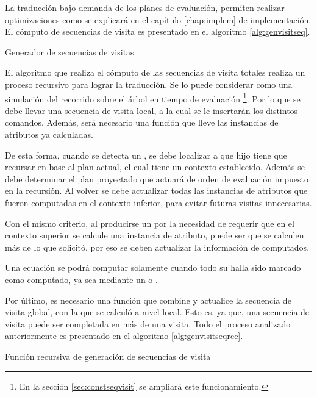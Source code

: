La traducción bajo demanda de los planes de evaluación, permiten realizar optimizaciones como se explicará en el capítulo \ref{chap:implem} de implementación. El cómputo de secuencias de visita es presentado en el algoritmo \ref{alg:genvisitseq}.

\begin{algorithm}[!ht]

\caption{\label{alg:genvisitseq} Generador de secuencias de visitas}
\end{algorithm}

El algoritmo que realiza el cómputo de las secuencias de visita totales realiza un proceso recursivo para lograr la traducción. Se lo puede considerar como una simulación del recorrido sobre el árbol en tiempo de evaluación \footnote{En la sección \ref{sec:constseqvisit} se ampliará este funcionamiento.}. Por lo que se debe llevar una secuencia de visita local, a la cual se le insertarán los distintos comandos. Además, será necesario una función que lleve las instancias de atributos ya calculadas.

De esta forma, cuando se detecta un , se debe localizar a que hijo tiene que recursar en base al plan actual, el cual tiene un contexto establecido. Además se debe determinar el plan proyectado que actuará de orden de evaluación impuesto en la recursión. Al volver se debe actualizar todas las instancias de atributos que fueron computadas en el contexto inferior, para evitar futuras visitas innecesarias.

Con el mismo criterio, al producirse un  por la necesidad de requerir que en el contexto superior se calcule una instancia de atributo, puede ser que se calculen más de lo que solicitó, por eso se deben actualizar la información de computados.

Una ecuación se podrá computar solamente cuando todo su  halla sido marcado como computado, ya sea mediante un  o .

Por último, es necesario una función que combine y actualice la secuencia de visita global, con la que se calculó a nivel local. Esto es, ya que, una secuencia de visita puede ser completada en más de una visita. Todo el proceso analizado anteriormente es presentado en el algoritmo \ref{alg:genvisitseqrec}.

\begin{algorithm}[!ht]

\caption{\label{alg:genvisitseqrec} Función recursiva de generación de secuencias de visita}
\end{algorithm}

